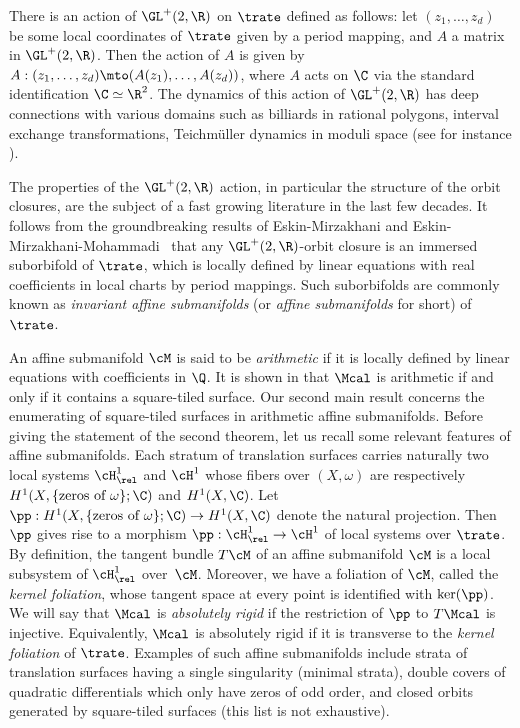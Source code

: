There is an action of $\GL^+(2,\R)$ on $\trate$ defined as follows: let $(z_1,\dots,z_d)$ be some local coordinates of $\trate$ given by a period mapping, and $A$ a matrix in $\GL^+(2,\R)$. Then the action of $A$ is given by $A: (z_1,\dots,z_d) \mto (A(z_1),\dots,A(z_d))$, where $A$ acts on $\C$ via the standard identification $\C\simeq \R^2$. The dynamics of this action of $\GL^+(2,\R)$ has deep connections with various domains such as billiards in rational polygons, interval exchange transformations, Teichmüller dynamics in moduli space (see for instance \cite{MaTa02, Zorich:survey}).

The properties of the $\GL^+(2,\R)$ action, in particular the structure of the orbit closures, are the subject of a fast growing literature in the last few decades. It follows from the groundbreaking results of Eskin-Mirzakhani \cite{EM18} and Eskin-Mirzakhani-Mohammadi~\cite{EMM15} that any $\GL^+(2,\R)$-orbit closure is an immersed suborbifold of $\trate$, which is locally defined by linear equations with real coefficients in local charts by period mappings. Such suborbifolds are commonly known as \emph{invariant affine submanifolds} (or \emph{affine submanifolds} for short) of $\trate$.

An affine submanifold $\cM$ is said to be \emph{arithmetic} if it is locally defined by linear equations with coefficients in $\Q$. It is shown in \cite{Wright14} that $\Mcal$ is arithmetic if and only if it contains a square-tiled surface.
Our second main result concerns the enumerating of square-tiled surfaces in arithmetic affine submanifolds.
Before giving the statement of the second theorem, let us recall some relevant features of affine submanifolds.
Each stratum of translation surfaces carries naturally two local systems $\cH^1_{\rel}$ and $\cH^1$ whose fibers over $(X,\omega)$ are respectively $H^1(X,\{\textrm{zeros of } \omega\};\C)$ and $H^1(X,\C)$. Let $\pp: H^1(X,\{\textrm{zeros of } \omega\};\C) \to H^1(X,\C)$ denote the natural projection. Then $\pp$ gives rise to a morphism $\pp: \cH^1_{\rel} \to \cH^1$ of local systems over $\trate$.
By definition, the tangent bundle $T\cM$ of an affine submanifold $\cM$ is a local subsystem of $\cH^1_{\rel}$ over~$\cM$.
Moreover, we have a foliation of $\cM$, called the \emph{kernel foliation}, whose tangent space at every point is identified with $\ker(\pp)$.
We will say that $\Mcal$ is \emph{absolutely rigid} if the restriction of $\pp$ to $T\Mcal$ is injective.
Equivalently, $\Mcal$ is absolutely rigid if it is transverse to the \emph{kernel foliation} of $\trate$.
Examples of such affine submanifolds include strata of translation surfaces having a single singularity (minimal strata), double covers of quadratic differentials which only have zeros of odd order, and closed orbits generated by square-tiled surfaces (this list is not exhaustive).

